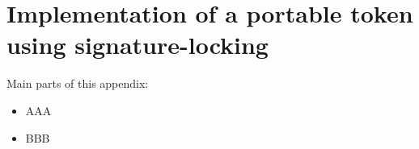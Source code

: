 \documentclass{VUMIFPSkursinis}
\begin{document}

\appendix  %

\section{Implementation of a portable token using signature-locking}
Main parts of this appendix:
\begin{itemize}
  \item AAA
  \item BBB
\end{itemize}
\end{document}
